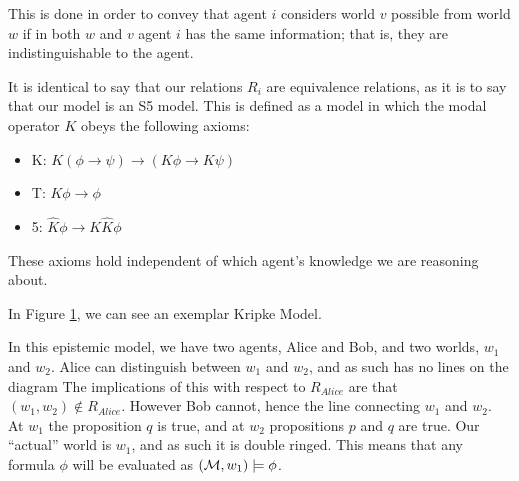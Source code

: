 \documentclass[10pt, a4paper]{report}
\begin{document}
This is done in order to convey that agent $i$ considers world $v$ possible from
world $w$ if in both $w$ and $v$ agent $i$ has the same information; that is,
they are indistinguishable to the agent.

It is identical to say that our relations $R_i$ are equivalence relations, as it
is to say that our model is an \textsf{S5} model. This is defined as a model in
which the modal operator $K$ obeys the following axioms:

\begin{itemize}
\item \textsf{K}: $K (\phi \rightarrow \psi) \rightarrow (K \phi \rightarrow K
  \psi)$
\item \textsf{T}: $K \phi \rightarrow \phi$
\item \textsf{5}: $\widehat K \phi \rightarrow K \widehat K \phi$
\end{itemize}

These axioms hold independent of which agent's knowledge we are reasoning about. 

\bigskip \bigskip \bigskip

\begin{figure}[h]
  \centering
  \label{fig:EgS5}
  \caption{}
\end{figure}

In Figure \ref{fig:EgS5}, we can see an exemplar Kripke Model.

In this epistemic model, we have two agents, Alice and Bob, and two worlds,
$w_1$ and $w_2$. Alice can distinguish between $w_1$ and $w_2$, and as such has
no lines on the diagram The implications of this with respect to $R_{Alice}$ are
that $(w_1, w_2) \not \in R_{Alice}$. However Bob cannot, hence the line
connecting $w_1$ and $w_2$. At $w_1$ the proposition $q$ is true, and at $w_2$
propositions $p$ and $q$ are true. Our ``actual'' world is $w_1$, and as such it
is double ringed. This means that any formula $\phi$ will be evaluated as
$(\mathcal{M}, w_1) \models \phi$.
\end{document}
